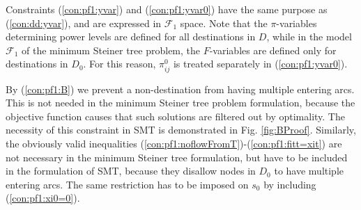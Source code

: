 Constraints (\ref{con:pf1:yvar}) and (\ref{con:pf1:yvar0}) have the same purpose as (\ref{con:dd:yvar}), and are expressed in $\mathcal{F}_1$ space. %
Note that the $\pi$-variables determining power levels are defined for all destinations in $D$, while in the model $\mathcal{F}_1$ \cite{Polzin} of the minimum Steiner tree problem, the $F$-variables are defined only for destinations in $D_0$.
For this reason, $\pi_{ij}^0$ is treated separately in (\ref{con:pf1:yvar0}).

By (\ref{con:pf1:B}) we prevent a non-destination from having multiple entering arcs.
This is not needed in the minimum Steiner tree problem formulation, because the objective function causes that such solutions are filtered out by optimality.
The necessity of this constraint in SMT is demonstrated in Fig. \ref{fig:BProof}.
Similarly, the obviously valid inequalities (\ref{con:pf1:noflowFromT})-(\ref{con:pf1:fitt=xit}) are not necessary in the minimum Steiner tree formulation, but have to be included in the formulation of SMT, because they  disallow nodes in $D_0$ to have multiple entering arcs.
The same restriction has to be imposed on $s_0$ by including (\ref{con:pf1:xi0=0}).
